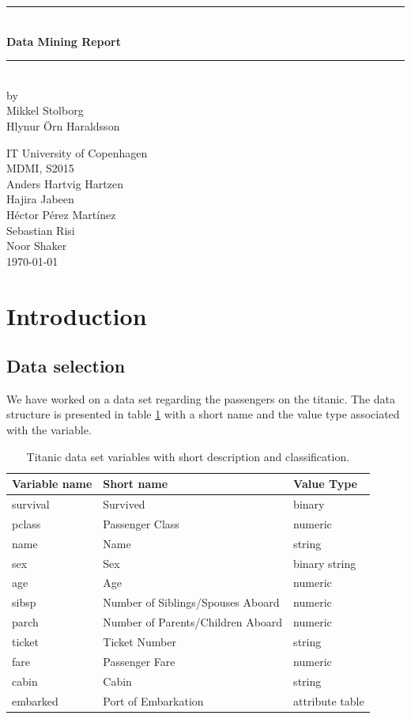 \documentclass[a4paper,11pt]{article}
\begin{document}
\begin{titlepage}

\centering \parindent=0pt
\newcommand{\HRule}{\rule{\textwidth}{1mm}}
 \HRule\\[1cm]\Huge\bfseries
Data Mining Report\\[0.7cm]
\HRule\\[4cm]  
\large by 
\\ Mikkel Stolborg
\\ Hlynur Örn Haraldsson
 \normalsize %
\begin{flushleft}
IT University of Copenhagen \\
MDMI, S2015\\
Anders Hartvig Hartzen\\
Hajira Jabeen\\
Héctor Pérez Martínez\\
Sebastian Risi\\
Noor Shaker\\
\today \end{flushleft}
\end{titlepage}

\tableofcontents
\pagebreak
\section{Introduction}
\subsection{Data selection}
We have worked on a data set regarding the passengers on the titanic. The data structure is presented in table \ref{titanData} with a short name and the value type associated with the variable.
\begin{table}[h]
\begin{tabular}{|l|l|l|}
\hline
Variable name & Short name & Value Type\\
\hline
survival & Survived & binary\\
pclass & Passenger Class & numeric\\
name & Name & string\\
sex & Sex & binary string\\
age & Age & numeric\\
sibsp & Number of Siblings/Spouses Aboard & numeric\\
parch & Number of Parents/Children Aboard & numeric\\
ticket & Ticket Number & string\\
fare & Passenger Fare & numeric\\
cabin & Cabin & string\\
embarked & Port of Embarkation & attribute table\\
\hline
\end{tabular}
\caption{Titanic data set variables with short description and classification.}
\label{titanData}
\end{table}
\end{document}
